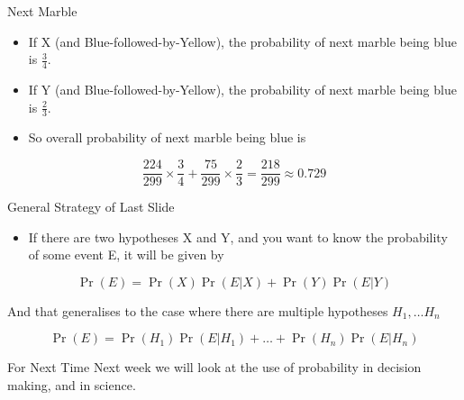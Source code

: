 \documentclass[
  ignorenonframetext,
]{beamer}
\providecommand{\tightlist}{%
  \setlength{\itemsep}{0pt}\setlength{\parskip}{0pt}}
\renewcommand{\,}{\text{, }}
\begin{document}
\begin{frame}{Next Marble}
\protect\hypertarget{next-marble}{}
\begin{itemize}
\tightlist
\item
  If X (and Blue-followed-by-Yellow), the probability of next marble
  being blue is \(\frac{3}{4}\).
\item
  If Y (and Blue-followed-by-Yellow), the probability of next marble
  being blue is \(\frac{2}{3}\). \pause
\item
  So overall probability of next marble being blue is
\end{itemize}

\[
 \frac{224}{299} \times \frac{3}{4} + \frac{75}{299} \times \frac{2}{3} = \frac{218}{299} \approx 0.729
\]
\end{frame}

\begin{frame}{General Strategy of Last Slide}
\protect\hypertarget{general-strategy-of-last-slide}{}
\begin{itemize}
\tightlist
\item
  If there are two hypotheses X and Y, and you want to know the
  probability of some event E, it will be given by
\end{itemize}

\[
\Pr(E) = \Pr(X)\Pr(E | X) + \Pr(Y)\Pr(E | Y)
\]

And that generalises to the case where there are multiple hypotheses
\(H_1, \dots H_n\)

\[
\Pr(E) = \Pr(H_1)\Pr(E | H_1) + \dots +  \Pr(H_n)\Pr(E | H_n)
\]
\end{frame}

\begin{frame}{For Next Time}
\protect\hypertarget{for-next-time}{}
Next week we will look at the use of probability in decision making, and
in science.
\end{frame}
\end{document}
